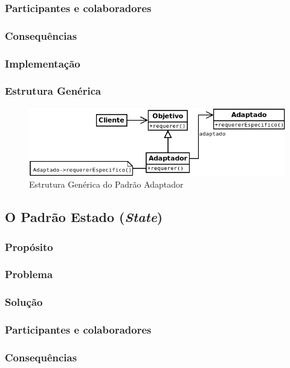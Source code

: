 \subsubsection{Participantes e colaboradores}
\subsubsection{Consequências}
\subsubsection{Implementação}
\subsubsection{Estrutura Genérica}

\begin{figure}[h]
\begin{center}
\includegraphics[scale=0.6]{adaptador.png}
\caption{Estrutura Genérica do Padrão Adaptador}\label{fig:adaptador}
\end{center}
\end{figure}

\subsection{O Padrão Estado (\textit{State})}
\subsubsection{Propósito}
\subsubsection{Problema}
\subsubsection{Solução}
\subsubsection{Participantes e colaboradores}
\subsubsection{Consequências}
